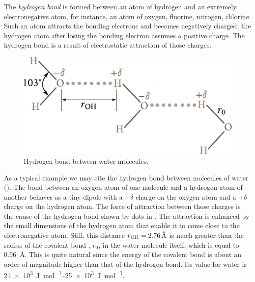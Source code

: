 The \textit{hydrogen bond} is formed between an atom of hydrogen and an extremely electronegative atom, for instance, an atom of oxygen, fluorine, nitrogen, chlorine. Such an atom attracts the bonding electrons and becomes negatively charged; the hydrogen atom after losing the bonding electron assumes a positive charge. The hydrogen bond is a result of electrostatic attraction of those charges.

\begin{figure}[t]
	\begin{center}
		\includegraphics[scale=0.85]{figures/ch_01/fig_1_9.pdf}
		\caption[]{Hydrogen bond between water molecules.}
		\label{fig:1_9}
	\end{center}
	\vspace{-0.7cm}
\end{figure}

As a typical example we may cite the hydrogen bond between molecules of water (). The  bond between an oxygen atom of one molecule and a hydrogen atom of another behaves as a tiny dipole with a $-\delta$ charge on the oxygen atom and a $+\delta$ charge on the hydrogen atom. The force of attraction between those charges is the cause of the hydrogen bond shown by dots in . The attraction is enhanced by the small dimensions of the hydrogen atom that enable it to come close to the electronegative atom. Still, this distance $r_{\ce{OH}}=\SI{2.76}{\angstrom}$ is much greater than the radius of the covalent bond , $r_0$, in the water molecule itself, which is equal to \SI{0.96}{\angstrom}. This is quite natural since the energy of the covalent bond is about an order of magnitude higher than that of the hydrogen bond. Its value for water is \SIrange{21e3}{25e3}{\joule\per\mole}.

